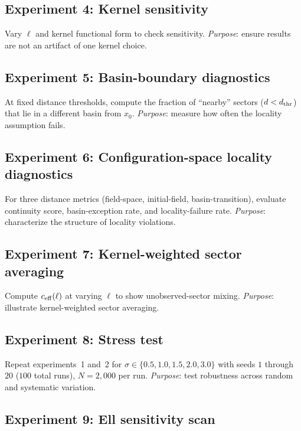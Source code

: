\subsection{Experiment 4: Kernel sensitivity}
\label{exp:4}

Vary $\ell$ and kernel functional form to check sensitivity.
\emph{Purpose}: ensure results are not an artifact of one kernel choice.

\subsection{Experiment 5: Basin-boundary diagnostics}
\label{exp:5}

At fixed distance thresholds, compute the fraction of ``nearby'' sectors
($d < d_{\rm thr}$) that lie in a different basin from $x_0$.
\emph{Purpose}: measure how often the locality assumption fails.

\subsection{Experiment 6: Configuration-space locality diagnostics}
\label{exp:6}

For three distance metrics (field-space, initial-field, basin-transition),
evaluate continuity score, basin-exception rate, and locality-failure rate.
\emph{Purpose}: characterize the structure of locality violations.

\subsection{Experiment 7: Kernel-weighted sector averaging}
\label{exp:7}

Compute $c_{\rm eff}(\ell)$ at varying $\ell$ to show unobserved-sector mixing.
\emph{Purpose}: illustrate kernel-weighted sector averaging.

\subsection{Experiment 8: Stress test}
\label{exp:8}

Repeat experiments~1 and~2 for $\sigma \in \{0.5, 1.0, 1.5, 2.0, 3.0\}$ with
seeds $1$ through $20$ ($100$ total runs), $N = 2,\!000$ per run.
\emph{Purpose}: test robustness across random and systematic variation.

\subsection{Experiment 9: Ell sensitivity scan}
\label{exp:9}


